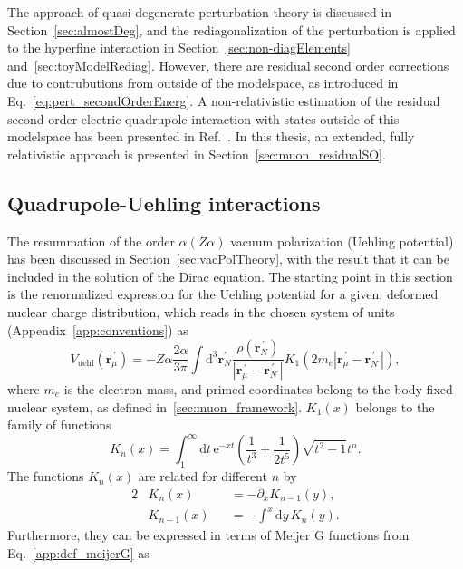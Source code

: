 The approach of quasi-degenerate perturbation theory is discussed in Section~\ref{sec:almostDeg}, and the rediagonalization of the perturbation is applied to the hyperfine interaction in Section~\ref{sec:non-diagElements} and~\ref{sec:toyModelRediag}. However, there are residual second order corrections due to contrubutions from outside of the modelspace, as introduced in Eq.~\eqref{eq:pert_secondOrderEnerg}. A non-relativistic estimation of the residual second order electric quadrupole interaction with states outside of this modelspace has been presented in Ref.~\cite{chen1970}. In this thesis, an extended, fully relativistic approach is presented in Section~\ref{sec:muon_residualSO}.

\subsection{Quadrupole-Uehling interactions}
\label{sec:muon_quadUehl}
The resummation of the order $\alpha (Z\alpha)$ vacuum polarization (Uehling potential) has been discussed in Section~\ref{sec:vacPolTheory}, with the result that it can be included in the solution of the Dirac equation. The starting point in this section is the renormalized expression for the Uehling potential for a given, deformed nuclear charge distribution, which reads in the chosen system of units (Appendix~\ref{app:conventions}) as~\cite{Fullerton1976}
\begin{equation}
{V_{\text{uehl}}(\mathbf{r}_\mu^{\,\prime})}{=}{-Z\alpha\frac{2 \alpha}{3\pi} \int \text{d}^3\mathbf{r}_N^{\prime} \frac{\rho(\mathbf{r}_N^{\,\prime})}{|\mathbf{r}_\mu^{\,\prime} - \mathbf{r}_N^{\,\prime}\,|} K_1(2m_e{|\mathbf{r}_\mu^{\,\prime} - \mathbf{r}_N^{\,\prime}\,|}),}
\label{eq:Vvp}
\end{equation}
where $m_e$ is the electron mass, and primed coordinates belong to the body-fixed nuclear system, as defined in~\ref{sec:muon_framework}. $K_1(x)$ belongs to the family of functions
\begin{equation}
K_n(x)=\int_1^\infty \text{d}t\,\text{e}^{-xt}\left(\frac{1}{t^3}+\frac{1}{2t^5}\right)\sqrt{t^2-1}t^n.
\label{eq:defKn}
\end{equation}
The functions $K_n(x)$ are related for different $n$ by
\begin{alignat}{2}
&K_n(x)&&=-\partial_x K_{n-1}(y),\\
&K_{n-1}(x)&&=-\int^x\text{d}y\, K_n(y).
\label{eq:Kninfo}
\end{alignat}
Furthermore, they can be expressed in terms of Meijer G functions from Eq.~\eqref{app:def_meijerG} as
